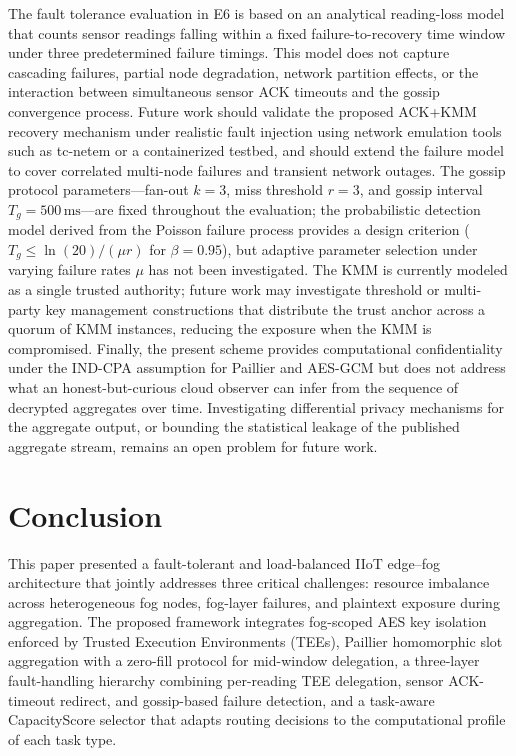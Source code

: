 \documentclass[conference]{IEEEtran}
\begin{document}
    The fault tolerance evaluation in E6 is based on an analytical reading-loss model that counts sensor readings falling within a fixed failure-to-recovery time window under three predetermined failure timings. This model does not capture cascading failures, partial node degradation, network partition effects, or the interaction between simultaneous sensor ACK timeouts and the gossip convergence process. Future work should validate the proposed ACK+KMM recovery mechanism under realistic fault injection using network emulation tools such as tc-netem or a containerized testbed, and should extend the failure model to cover correlated multi-node failures and transient network outages. The gossip protocol parameters---fan-out $k{=}3$, miss threshold $r{=}3$, and gossip interval $T_g{=}500\,\text{ms}$---are fixed throughout the evaluation; the probabilistic detection model derived from the Poisson failure process provides a design criterion ($T_g \leq \ln(20)/(\mu r)$ for $\beta=0.95$), but adaptive parameter selection under varying failure rates $\mu$ has not been investigated. The KMM is currently modeled as a single trusted authority; future work may investigate threshold or multi-party key management constructions that distribute the trust anchor across a quorum of KMM instances, reducing the exposure when the KMM is compromised. Finally, the present scheme provides computational confidentiality under the IND-CPA assumption for Paillier and AES-GCM but does not address what an honest-but-curious cloud observer can infer from the sequence of decrypted aggregates over time. Investigating differential privacy mechanisms for the aggregate output, or bounding the statistical leakage of the published aggregate stream, remains an open problem for future work.

    \section{Conclusion}

    This paper presented a fault-tolerant and load-balanced IIoT edge--fog architecture that jointly addresses three critical challenges: resource imbalance across heterogeneous fog nodes, fog-layer failures, and plaintext exposure during aggregation. The proposed framework integrates fog-scoped AES key isolation enforced by Trusted Execution Environments (TEEs), Paillier homomorphic slot aggregation with a zero-fill protocol for mid-window delegation, a three-layer fault-handling hierarchy combining per-reading TEE delegation, sensor ACK-timeout redirect, and gossip-based failure detection, and a task-aware CapacityScore selector that adapts routing decisions to the computational profile of each task type.
\end{document}
